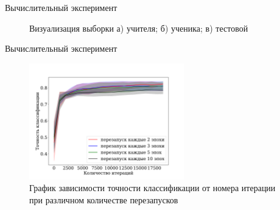 \documentclass[10pt, aspectratio=169]{beamer}
\begin{document}
\begin{frame}{Вычислительный эксперимент}
\begin{figure}
\begin{minipage}[h]{0.3\linewidth}
    \end{minipage}
    \begin{minipage}[h]{0.3\linewidth}
    \end{minipage}
    \vspace{-0.2 cm}
    \caption*{\fontsize{8}{5}\selectfont
    Визуализация выборки а) учителя; б) ученика; в) тестовой}
\end{figure}
\end{frame}

\begin{frame}{Вычислительный эксперимент}
\begin{figure}
    \includegraphics[width=0.6\textwidth]{linear_train_splines_every_epoch.pdf}
    \caption*{График зависимости точности классификации от номера итерации при различном количестве перезапусков}
\end{figure}
\end{frame}
\end{document}
